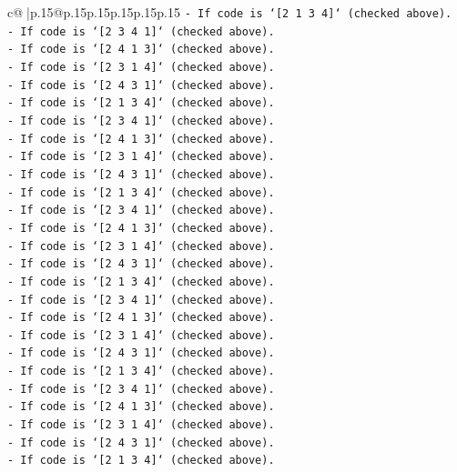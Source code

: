\documentclass{article}
\begin{document}
{\begin{supertabular}{c@{$\;$}|p{.15\linewidth}@{}p{.15\linewidth}p{.15\linewidth}p{.15\linewidth}p{.15\linewidth}p{.15\linewidth}}
{{{\texttt{{-} If code is `{[}2 1 3 4{]}` (checked above).} \\
\texttt{{-} If code is `{[}2 3 4 1{]}` (checked above).} \\
\texttt{{-} If code is `{[}2 4 1 3{]}` (checked above).} \\
\texttt{{-} If code is `{[}2 3 1 4{]}` (checked above).} \\
\texttt{{-} If code is `{[}2 4 3 1{]}` (checked above).} \\
\texttt{{-} If code is `{[}2 1 3 4{]}` (checked above).} \\
\texttt{{-} If code is `{[}2 3 4 1{]}` (checked above).} \\
\texttt{{-} If code is `{[}2 4 1 3{]}` (checked above).} \\
\texttt{{-} If code is `{[}2 3 1 4{]}` (checked above).} \\
\texttt{{-} If code is `{[}2 4 3 1{]}` (checked above).} \\
\texttt{{-} If code is `{[}2 1 3 4{]}` (checked above).} \\
\texttt{{-} If code is `{[}2 3 4 1{]}` (checked above).} \\
\texttt{{-} If code is `{[}2 4 1 3{]}` (checked above).} \\
\texttt{{-} If code is `{[}2 3 1 4{]}` (checked above).} \\
\texttt{{-} If code is `{[}2 4 3 1{]}` (checked above).} \\
\texttt{{-} If code is `{[}2 1 3 4{]}` (checked above).} \\
\texttt{{-} If code is `{[}2 3 4 1{]}` (checked above).} \\
\texttt{{-} If code is `{[}2 4 1 3{]}` (checked above).} \\
\texttt{{-} If code is `{[}2 3 1 4{]}` (checked above).} \\
\texttt{{-} If code is `{[}2 4 3 1{]}` (checked above).} \\
\texttt{{-} If code is `{[}2 1 3 4{]}` (checked above).} \\
\texttt{{-} If code is `{[}2 3 4 1{]}` (checked above).} \\
\texttt{{-} If code is `{[}2 4 1 3{]}` (checked above).} \\
\texttt{{-} If code is `{[}2 3 1 4{]}` (checked above).} \\
\texttt{{-} If code is `{[}2 4 3 1{]}` (checked above).} \\
\texttt{{-} If code is `{[}2 1 3 4{]}` (checked above).} \\
}}}
\end{supertabular}}
\end{document}
